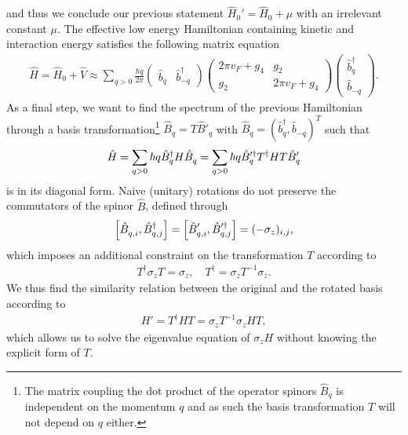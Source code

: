 and thus we conclude our previous statement $\hat H_0' = \hat H_0 + \mu$ with an irrelevant constant $\mu$.
The effective low energy Hamiltonian containing kinetic and interaction energy satisfies the following matrix equation
\begin{align}
    \hat H = \hat H_0 + \hat V \approx
    \sum_{q>0}\frac{\hbar q}{2\pi}
    \begin{pmatrix}
        \hat b_q & \hat b^\dag_{-q}
    \end{pmatrix}
    \begin{pmatrix}
        2\pi v_F + g_4 & g_2 \\
        g_2 & 2\pi v_F + g_4
    \end{pmatrix}
    \begin{pmatrix}
        \hat b^\dag_q \\ \hat b_{-q}
    \end{pmatrix}
    .
    \label{eq:luttinger_hamiltonian_nondiagonal}
\end{align}
As a final step, we want to find the spectrum of the previous Hamiltonian through a basis transformation\footnote{The matrix coupling the dot product of the operator spinors $\hat B_q$ is independent on the momentum $q$ and as such the basis transformation $T$ will not depend on $q$ either.} $\hat B_q = T \hat B'_q$ with $\hat B_q = (\hat b_q^\dag, \hat b_{-q})^T$ such that
\begin{align}
    \hat H = \sum_{q>0}\hbar q\hat B^\dag_q H \hat B^\pdag_q = \sum_{q>0}\hbar q\hat B'^\dag_q T^\dag H T \hat B'^\pdag_q
\end{align}
is in its diagonal form.
Naive (unitary) rotations do not preserve the commutators of the spinor $\hat B$, defined through
\begin{align}
    \commutator{\hat B_{q,i}^\pdag,\hat B^\dag_{q,j}} = \commutator{\hat B_{q,i}'^\pdag,\hat B'^\dag_{q,j}} = (-\sigma_z)_{i,j},
\end{align}
which imposes an additional constraint on the transformation $T$ according to
\begin{align}
    T^\dag\sigma_z T = \sigma_z,
    \quad
    T^\dag = \sigma_zT^{-1}\sigma_z.
\end{align}
We thus find the similarity relation between the original and the rotated basis according to
\begin{align}
    H'=T^\dag HT =\sigma_z T^{-1}\sigma_z H T,
\end{align}
which allows us to solve the eigenvalue equation of $\sigma_z H$ without knowing the explicit form of $T$.
